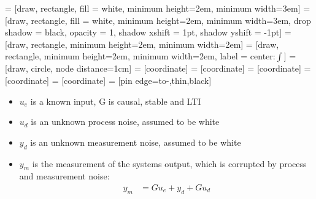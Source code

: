  = [draw, rectangle, fill = white, minimum height=2em, minimum width=3em]
 = [draw, rectangle, fill = white, minimum height=2em, minimum width=3em, drop shadow = {black, opacity = 1, shadow xshift = 1pt, shadow yshift = -1pt}]
 = [draw, rectangle, minimum height=2em, minimum width=2em]
 = [draw, rectangle, minimum height=2em, minimum width=2em, label = {center:$\int$}]
 = [draw, circle, node distance=1cm]
 = [coordinate]
 = [coordinate]
 = [coordinate]
 = [coordinate]
 = [coordinate]
 = [pin edge={to-,thin,black}]
\begin{center}

\end{center}
\vspace*{-.5em}
\begin{itemize}
    \item		$u_e$ is a known input, G is causal, stable and LTI
    \item		$u_d$ is an unknown process noise, assumed to be white
    \item		$y_d$ is an unknown measurement noise, assumed to be white
    \item		$y_m$ is the measurement of the systems output, which is corrupted by process and measurement noise:
            \begin{align*}
                y_m &= Gu_e + y_d + Gu_d
            \end{align*}
\end{itemize}